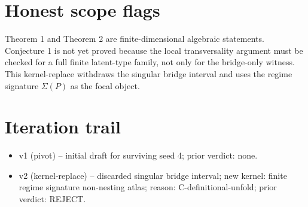 \documentclass[11pt]{article}
\theoremstyle{definition}
\theoremstyle{plain}
\theoremstyle{remark}
\begin{document}
\section{Honest scope flags}
Theorem 1 and Theorem 2 are finite-dimensional algebraic statements. Conjecture 1 is not yet proved because the local transversality argument must be checked for a full finite latent-type family, not only for the bridge-only witness. This kernel-replace withdraws the singular bridge interval and uses the regime signature \(\Sigma(P)\) as the focal object.

\section{Iteration trail}
\begin{itemize}[leftmargin=2em]
\item v1 (pivot) -- initial draft for surviving seed 4; prior verdict: none.
\item v2 (kernel-replace) -- discarded singular bridge interval; new kernel: finite regime signature non-nesting atlas; reason: C-definitional-unfold; prior verdict: REJECT.
\end{itemize}
\end{document}
